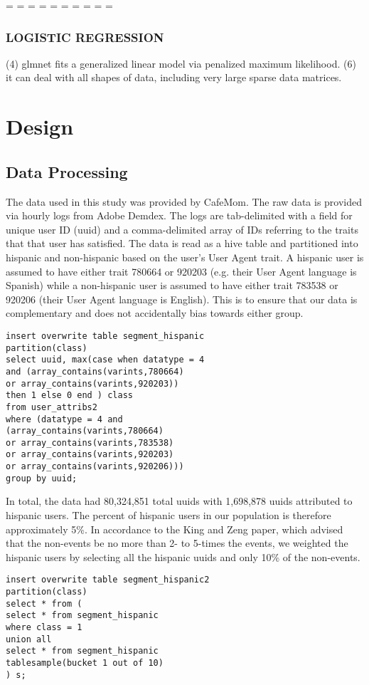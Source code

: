 \documentclass[a4paper]{article}
\begin{document}
\begin{multicols}{2}
=
=
=
=
=
=
=
=
=
=
\subsubsection*{LOGISTIC REGRESSION}
(4) glmnet fits a generalized linear model via penalized maximum likelihood.
(6) it can deal with all shapes of data, including very large sparse data matrices.

\section*{Design}
\subsection*{Data Processing}
The data used in this study was provided by CafeMom. The raw data is provided via hourly logs from Adobe Demdex. The logs are tab-delimited with a field for unique user ID (uuid) and a comma-delimited array of IDs referring to the traits that that user has satisfied. The data is read as a hive table and partitioned into hispanic and non-hispanic based on the user's User Agent trait. A hispanic user is assumed to have either trait 780664 or 920203 (e.g. their User Agent language is Spanish) while a non-hispanic user is assumed to have either trait 783538 or 920206 (their User Agent language is English). This is to ensure that our data is complementary and does not accidentally bias towards either group.

\begin{verbatim}
insert overwrite table segment_hispanic 
partition(class)
select uuid, max(case when datatype = 4 
and (array_contains(varints,780664) 
or array_contains(varints,920203))
then 1 else 0 end ) class
from user_attribs2
where (datatype = 4 and 
(array_contains(varints,780664) 
or array_contains(varints,783538) 
or array_contains(varints,920203) 
or array_contains(varints,920206)))
group by uuid;
\end{verbatim}

In total, the data had 80,324,851 total uuids with 1,698,878 uuids attributed to hispanic users. The percent of hispanic users in our population is therefore approximately 5\%. In accordance to the King and Zeng paper, which advised that the non-events be no more than 2- to 5-times the events, we weighted the hispanic users by selecting all the hispanic uuids and only 10\% of the non-events.
\begin{verbatim}
insert overwrite table segment_hispanic2
partition(class)
select * from ( 
select * from segment_hispanic 
where class = 1 
union all 
select * from segment_hispanic 
tablesample(bucket 1 out of 10)
) s;
\end{verbatim}


\end{multicols}
\end{document}
